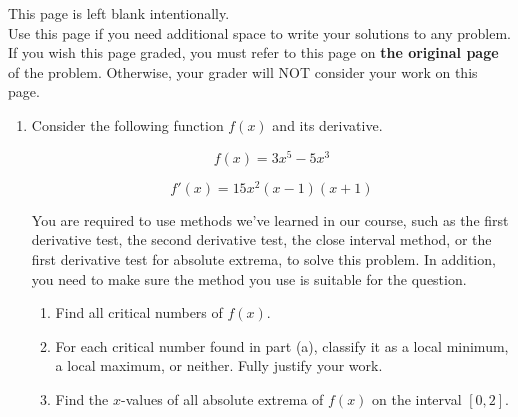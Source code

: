 \documentclass[11pt]{article}
\begin{document}
\vfill


\newpage

This page is left blank intentionally.\\

Use this page if you need additional space to write your solutions to any problem. \\

If you wish this page graded, you must refer to this page on \textbf{the original page} of the problem. Otherwise, your grader will NOT consider your work on this page.

\newpage%


\begin{enumerate}


\item Consider the following function $f(x)$ and its derivative.

\[f(x)=3x^5-5x^3\]%

\[f'(x)=15x^2(x-1)(x+1)\]%

You are required to use methods we've learned in our course, such as the first derivative test, the second derivative test, the close interval method, or the first derivative test for absolute extrema, to solve this problem. In addition, you need to make sure the method you use is suitable for the question.

\begin{enumerate}
    \item Find all critical numbers of $f(x)$.

    \vfill

    \item For each critical number found in part (a), classify it as a local minimum, a local maximum, or neither. Fully justify your work.

    \vfill
    \vfill
    \vfill

    \item Find the $x$-values of all absolute extrema of $f(x)$ on the interval $[0, 2]$.

    \vfill
    \vfill
    \vfill
\end{enumerate}



\end{enumerate}
\end{document}
